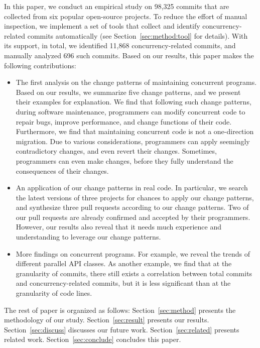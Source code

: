 In this paper, we conduct an empirical study on 98,325 commits that are collected from six popular open-source projects. To reduce the effort of manual inspection, we implement a set of tools that collect and identify concurrency-related commits automatically (see Section~\ref{sec:method:tool} for details). With its support, in total, we identified 11,868 concurrency-related commits, and manually analyzed 696 such commits. Based on our results, this paper makes the following contributions:

\begin{itemize}
	\item The first analysis on the change patterns of maintaining concurrent programs. Based on our results, we summarize five change patterns, and we present their examples for explanation. We find that following such change patterns, during software maintenance, programmers can modify concurrent code to repair bugs, improve performance, and change functions of their code. Furthermore, we find that maintaining concurrent code is not a one-direction migration. Due to various considerations, programmers can apply seemingly contradictory changes, and even revert their changes. Sometimes, programmers can even make changes, before they fully understand the consequences of their changes.
	\item An application of our change patterns in real code. In particular, we search the latest versions of three projects for chances to apply our change patterns, and synthesize three pull requests according to our change patterns. Two of our pull requests are already confirmed and accepted by their programmers. However, our results also reveal that it needs much experience and understanding to leverage our change patterns.
	\item More findings on concurrent programs. For example, we reveal the trends of different parallel API classes. As another example, we find that at the granularity of commits, there still exists a correlation between total commits and concurrency-related commits, but it is less significant than at the granularity of code lines.
\end{itemize}

The rest of paper is organized as follows: Section~\ref{sec:method} presents the methodology of our study. Section~\ref{sec:result} presents our results. Section~\ref{sec:discuss} discusses our future work. Section~\ref{sec:related} presents related work. Section~\ref{sec:conclude} concludes this paper.
